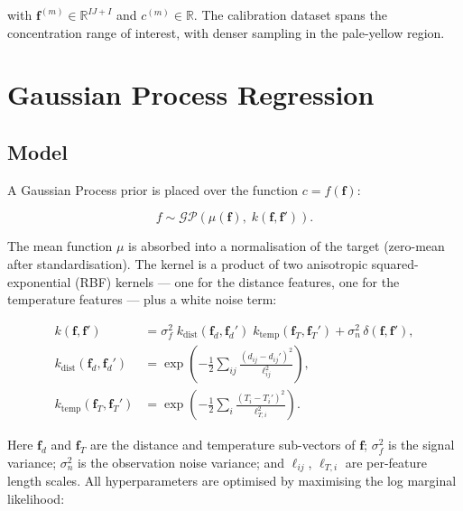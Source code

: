 \documentclass[11pt, a4paper]{article}
\newcommand{\R}{\mathbb{R}}
\begin{document}
with $\mathbf{f}^{(m)} \in \R^{IJ+I}$ and $c^{(m)} \in \R$.
The calibration dataset spans the concentration range of interest,
with denser sampling in the pale-yellow region.

\section{Gaussian Process Regression}

\subsection{Model}

A Gaussian Process prior is placed over the function
$c = f(\mathbf{f})$:

\begin{equation}
  f \sim \mathcal{GP}\!\left(\mu(\mathbf{f}),\;
                              k(\mathbf{f}, \mathbf{f}')\right).
  \label{eq:gp-prior}
\end{equation}

The mean function $\mu$ is absorbed into a normalisation of the
target (zero-mean after standardisation).
The kernel is a product of two anisotropic squared-exponential
(RBF) kernels --- one for the distance features, one for the
temperature features --- plus a white noise term:

\begin{align}
  k(\mathbf{f}, \mathbf{f}')
    &= \sigma_f^2\;
       k_{\mathrm{dist}}(\mathbf{f}_d, \mathbf{f}_d')\;
       k_{\mathrm{temp}}(\mathbf{f}_T, \mathbf{f}_T')
       + \sigma_n^2\,\delta(\mathbf{f}, \mathbf{f}'),
  \label{eq:kernel} \\[4pt]
  k_{\mathrm{dist}}(\mathbf{f}_d, \mathbf{f}_d')
    &= \exp\!\left(
         -\frac{1}{2}
         \sum_{ij}
         \frac{(d_{ij} - d_{ij}')^2}{\ell_{ij}^2}
       \right),
  \label{eq:kernel-dist} \\[4pt]
  k_{\mathrm{temp}}(\mathbf{f}_T, \mathbf{f}_T')
    &= \exp\!\left(
         -\frac{1}{2}
         \sum_{i}
         \frac{(T_i - T_i')^2}{\ell_{T,i}^2}
       \right).
  \label{eq:kernel-temp}
\end{align}

Here $\mathbf{f}_d$ and $\mathbf{f}_T$ are the distance and temperature
sub-vectors of $\mathbf{f}$; $\sigma_f^2$ is the signal variance;
$\sigma_n^2$ is the observation noise variance; and $\ell_{ij}$,
$\ell_{T,i}$ are per-feature length scales.
All hyperparameters are optimised by maximising the log marginal
likelihood:
\end{document}
